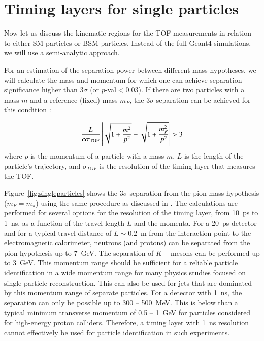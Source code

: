 \section{Timing layers for single particles}

Now let us discuss the kinematic regions for the TOF measurements in relation to
either SM particles or BSM particles. Instead of the full Geant4 simulations, we will
use a semi-analytic approach.  
 
For an estimation of the separation power between different mass hypotheses, we will
calculate the mass and momentum for which one can achieve separation significance higher than $3\sigma$ (or $p$-val$<0.03$). 
If there are two particles with a mass $m$ and a reference (fixed) mass $m_F$, the $3\sigma$ separation can be 
achieved for this condition  \cite{Cerri:2018rkm}:

\begin{equation}
\frac{L}{c \sigma_{\textsc{TOF}}}\left|\sqrt{1+\frac{m^2}{p^2}} - \sqrt{1+\frac{m_F^2}{p^2}}\right| > 3
\label{eqTOF}
\end{equation}
where $p$ is the momentum of a particle with a mass $m$, $L$  is the length of the particle's trajectory, 
and $\sigma_{TOF}$ is the
resolution  of the timing layer that measures the TOF.

Figure~\ref{fig:singleparticles} shows the $3\sigma$ separation from the pion
mass hypothesis ($m_F=m_{\pi}$) using the same procedure as discussed  in \cite{Cerri:2018rkm}. The 
calculations are performed for several options for the resolution of the timing layer, from 10~ps to 1~ns,
as a function of the travel length $L$ and the momenta. For a 20~ps detector and  for a typical travel 
distance of $L\sim 0.2$~m from the interaction point to the 
electromagnetic calorimeter, neutrons (and protons) can be separated from the pion hypothesis up to 7~GeV. 
The separation of $K-$mesons can be performed up to 3~GeV.
This momentum range should be sufficient for a reliable particle identification in a wide momentum range 
for many physics studies focused on single-particle reconstruction. This can also be used for jets that are dominated
by this momentum range of separate particles.
For a detector  with 1~ns, the separation can only be possible  up to  300 -- 500~MeV. This is below  than a typical
minimum transverse momentum of 0.5 -- 1~GeV for particles considered for high-energy proton colliders.
Therefore, a timing layer with 1~ns resolution cannot effectively be used for particle identification in such experiments.

